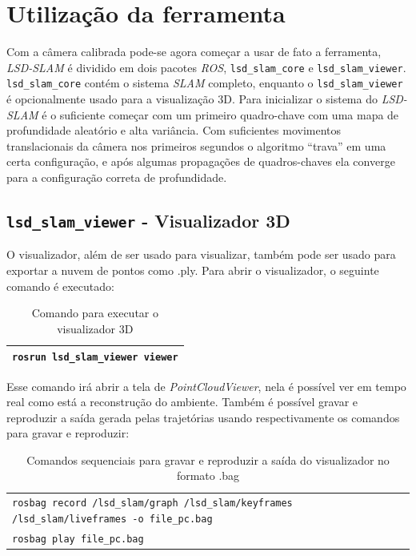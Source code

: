 \section{Utilização da ferramenta}

Com a câmera calibrada pode-se agora começar a usar de fato a ferramenta, \textit{LSD-SLAM} é dividido em dois pacotes \textit{ROS}, \texttt{lsd\_slam\_core} e \texttt{lsd\_slam\_viewer}. \texttt{lsd\_slam\_core} contém o sistema \textit{SLAM} completo, enquanto o \texttt{lsd\_slam\_viewer} é opcionalmente usado para a visualização 3D.
Para inicializar o sistema do \textit{LSD-SLAM} é o suficiente começar com um primeiro quadro-chave com uma mapa de profundidade aleatório e alta variância. Com suficientes movimentos translacionais da câmera nos primeiros segundos o algoritmo “trava” em uma certa configuração, e após algumas propagações de quadros-chaves ela converge para a configuração correta de profundidade.

\subsection{\texttt{lsd\_slam\_viewer} - Visualizador 3D}

O visualizador, além de ser usado para visualizar, também pode ser usado para exportar a nuvem de pontos como .ply. Para abrir o visualizador, o seguinte comando é executado:

\begin{table}[!ht]\label{tb:12}
\begin{tabular}{| p{\textwidth}|}
\hline
\texttt{rosrun lsd\_slam\_viewer viewer}\\
\hline
\end{tabular}
\caption{Comando para executar o visualizador 3D}
\end{table}

Esse comando irá abrir a tela de \textit{PointCloudViewer}, nela é possível ver em tempo real como está a reconstrução do ambiente. Também é possível gravar e reproduzir a saída gerada pelas trajetórias usando respectivamente os comandos para gravar e reproduzir:

\begin{table}[!ht]\label{tb:13}
\begin{tabular}{| p{\textwidth}|}
\hline
\texttt{rosbag record /lsd\_slam/graph /lsd\_slam/keyframes /lsd\_slam/liveframes -o file\_pc.bag}\\
\texttt{rosbag play file\_pc.bag}\\
\hline
\end{tabular}
\caption{Comandos sequenciais para gravar e reproduzir a saída do visualizador no formato .bag}
\end{table}

